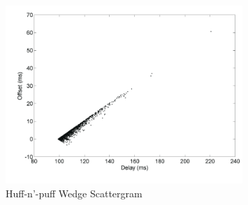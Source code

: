 
\begin{figure}[htb]
    \centering
    \includegraphics[width=0.8\textwidth]{figures/huff_n_puff.png}
    \caption{Huff-n'-puff Wedge Scattergram}
    \label{fig:huff_n_puff2}
\end{figure}

